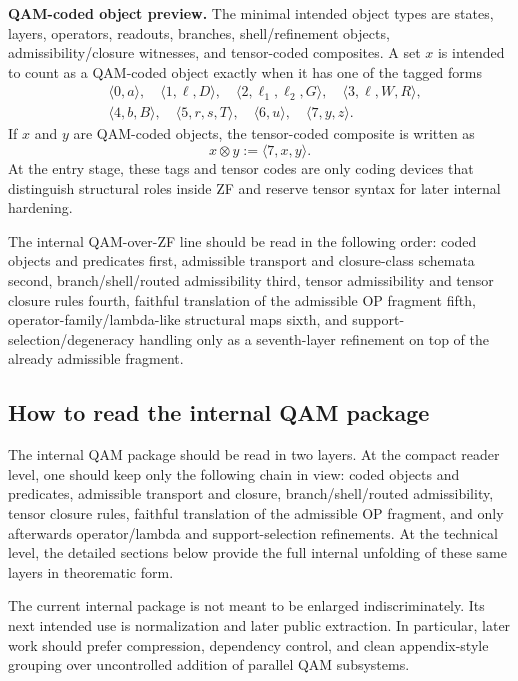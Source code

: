 \begin{remark}
\textbf{QAM-coded object preview.} The minimal intended object types are states, layers, operators, readouts, branches, shell/refinement objects, admissibility/closure witnesses, and tensor-coded composites. A set $x$ is intended to count as a QAM-coded object exactly when it has one of the tagged forms
\[
\begin{aligned}
&\langle 0,a\rangle,\quad
\langle 1,\ell,D\rangle,\quad
\langle 2,\ell_1,\ell_2,G\rangle,\quad
\langle 3,\ell,W,R\rangle,\\
&\langle 4,b,B\rangle,\quad
\langle 5,r,s,T\rangle,\quad
\langle 6,u\rangle,\quad
\langle 7,y,z\rangle.
\end{aligned}
\]
If $x$ and $y$ are QAM-coded objects, the tensor-coded composite is written as
\[
x \otimes y := \langle 7,x,y\rangle.
\]
At the entry stage, these tags and tensor codes are only coding devices that distinguish structural roles inside ZF and reserve tensor syntax for later internal hardening.
\end{remark}

\begin{remark}
The internal QAM-over-ZF line should be read in the following order: coded objects and predicates first, admissible transport and closure-class schemata second, branch/shell/routed admissibility third, tensor admissibility and tensor closure rules fourth, faithful translation of the admissible OP fragment fifth, operator-family/lambda-like structural maps sixth, and support-selection/degeneracy handling only as a seventh-layer refinement on top of the already admissible fragment.
\end{remark}

\subsection*{How to read the internal QAM package}
The internal QAM package should be read in two layers. At the compact reader level, one should keep only the following chain in view: coded objects and predicates, admissible transport and closure, branch/shell/routed admissibility, tensor closure rules, faithful translation of the admissible OP fragment, and only afterwards operator/lambda and support-selection refinements. At the technical level, the detailed sections below provide the full internal unfolding of these same layers in theorematic form.

\begin{remark}
The current internal package is not meant to be enlarged indiscriminately. Its next intended use is normalization and later public extraction. In particular, later work should prefer compression, dependency control, and clean appendix-style grouping over uncontrolled addition of parallel QAM subsystems.
\end{remark}

